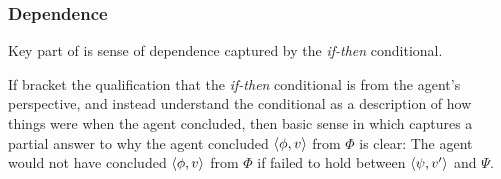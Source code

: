 \subsubsection{Dependence}
\label{sec:dependence}

\begin{note}
  Key part of \qWhyV{} is sense of dependence captured by the \emph{if-then} conditional.

  If bracket the qualification that the \emph{if-then} conditional is from the agent's perspective, and instead understand the conditional as a description of how things were when the agent concluded, then basic sense in which \qWhyV{} captures a partial answer to why the agent concluded \(\langle \phi, v \rangle\) from \(\Phi\) is clear:
  The agent would not have concluded \(\langle \phi, v \rangle\) from \(\Phi\) if \support{} failed to hold between \(\langle \psi, v' \rangle\) and \(\Psi\).
\end{note}

